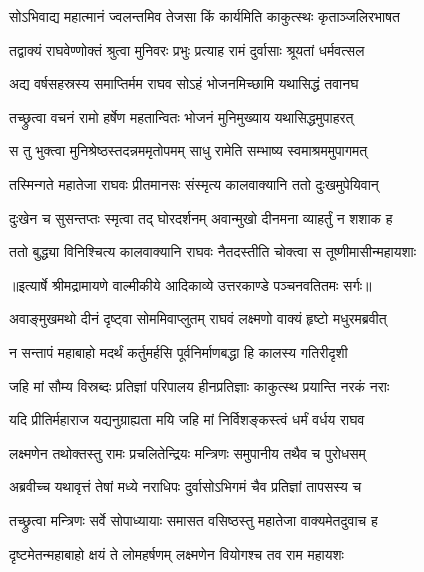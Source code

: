 \twolineshloka
{सोऽभिवाद्य महात्मानं ज्वलन्तमिव तेजसा}
{किं कार्यमिति काकुत्स्थः कृताञ्जलिरभाषत} %

\twolineshloka
{तद्वाक्यं राघवेण्णोक्तं श्रुत्वा मुनिवरः प्रभुः}
{प्रत्याह रामं दुर्वासाः श्रूयतां धर्मवत्सल} %

\twolineshloka
{अद्य वर्षसहस्रस्य समाप्तिर्मम राघव}
{सोऽहं भोजनमिच्छामि यथासिद्धं तवानघ} %

\twolineshloka
{तच्छ्रुत्वा वचनं रामो हर्षेण महतान्वितः}
{भोजनं मुनिमुख्याय यथासिद्धमुपाहरत्} %

\twolineshloka
{स तु भुक्त्वा मुनिश्रेष्ठस्तदन्नममृतोपमम्}
{साधु रामेति सम्भाष्य स्वमाश्रममुपागमत्} %

\twolineshloka
{तस्मिन्गते महातेजा राघवः प्रीतमानसः}
{संस्मृत्य कालवाक्यानि ततो दुःखमुपेयिवान्} %

\twolineshloka
{दुःखेन च सुसन्तप्तः स्मृत्वा तद् घोरदर्शनम्}
{अवान्मुखो दीनमना व्याहर्तुं न शशाक ह} %

\twolineshloka
{ततो बुद्ध्या विनिश्चित्य कालवाक्यानि राघवः}
{नैतदस्तीति चोक्त्वा स तूष्णीमासीन्महायशाः} %


{॥इत्यार्षे श्रीमद्रामायणे वाल्मीकीये आदिकाव्ये उत्तरकाण्डे पञ्चनवतितमः सर्गः॥}


\twolineshloka
{अवाङ्मुखमथो दीनं दृष्ट्वा सोममिवाप्लुतम्}
{राघवं लक्ष्मणो वाक्यं हृष्टो मधुरमब्रवीत्} %

\twolineshloka
{न सन्तापं महाबाहो मदर्थं कर्तुमर्हसि}
{पूर्वनिर्माणबद्धा हि कालस्य गतिरीदृशी} %

\twolineshloka
{जहि मां सौम्य विस्रब्दः प्रतिज्ञां परिपालय}
{हीनप्रतिज्ञाः काकुत्स्थ प्रयान्ति नरकं नराः} %

\twolineshloka
{यदि प्रीतिर्महाराज यद्यनुग्राह्यता मयि}
{जहि मां निर्विशङ्कस्त्वं धर्मं वर्धय राघव} %

\twolineshloka
{लक्ष्मणेन तथोक्तस्तु रामः प्रचलितेन्द्रियः}
{मन्त्रिणः समुपानीय तथैव च पुरोधसम्} %

\twolineshloka
{अब्रवीच्च यथावृत्तं तेषां मध्ये नराधिपः}
{दुर्वासोऽभिगमं चैव प्रतिज्ञां तापसस्य च} %

\twolineshloka
{तच्छ्रुत्वा मन्त्रिणः सर्वे सोपाध्यायाः समासत}
{वसिष्ठस्तु महातेजा वाक्यमेतदुवाच ह} %

\twolineshloka
{दृष्टमेतन्महाबाहो क्षयं ते लोमहर्षणम्}
{लक्ष्मणेन वियोगश्च तव राम महायशः} %

